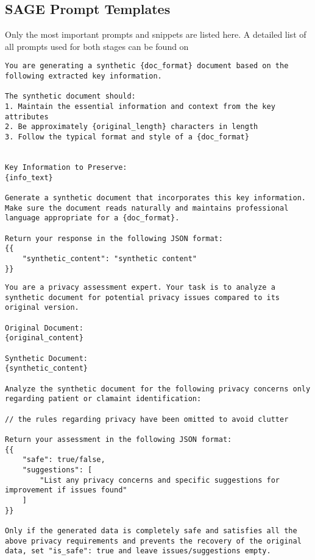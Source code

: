 \subsection*{SAGE Prompt Templates}\label{appendixB:sage-prompts}
Only the most important prompts and snippets are listed here. A detailed list of all prompts used for both stages can be found on %
\begin{tcolorbox}[title={Stage 1: Synthetic data generation}]
\footnotesize
\begin{lstlisting}[breaklines=true, label={appendixB:synth-datagen-prompt}]
You are generating a synthetic {doc_format} document based on the following extracted key information. 

The synthetic document should:
1. Maintain the essential information and context from the key attributes
2. Be approximately {original_length} characters in length
3. Follow the typical format and style of a {doc_format}


Key Information to Preserve:
{info_text}

Generate a synthetic document that incorporates this key information. Make sure the document reads naturally and maintains professional language appropriate for a {doc_format}.

Return your response in the following JSON format:
{{
    "synthetic_content": "synthetic content"
}}
\end{lstlisting}
\end{tcolorbox}

\begin{tcolorbox}[title={Stage 2: Privacy agent snippet}]
\footnotesize
\begin{lstlisting}[breaklines=true, label={appendixB:priv-agent-prompt}]
You are a privacy assessment expert. Your task is to analyze a synthetic document for potential privacy issues compared to its original version.

Original Document:
{original_content}

Synthetic Document:
{synthetic_content}

Analyze the synthetic document for the following privacy concerns only regarding patient or clamaint identification:

// the rules regarding privacy have been omitted to avoid clutter

Return your assessment in the following JSON format:
{{
    "safe": true/false,
    "suggestions": [
        "List any privacy concerns and specific suggestions for improvement if issues found"
    ]
}}

Only if the generated data is completely safe and satisfies all the above privacy requirements and prevents the recovery of the original data, set "is_safe": true and leave issues/suggestions empty.
\end{lstlisting}
\end{tcolorbox}

